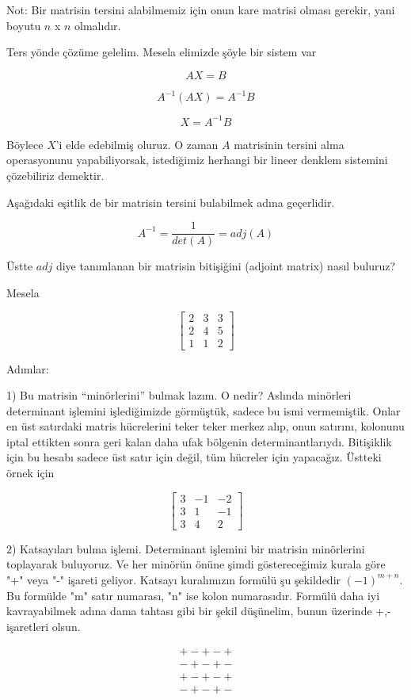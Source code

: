 \documentclass[12pt,fleqn]{article}\usepackage{../../common}
\begin{document}
Not: Bir matrisin tersini alabilmemiz için onun kare matrisi olması gerekir,
yani boyutu $n$ x $n$ olmalıdır.

Ters yönde çözüme gelelim. Mesela elimizde şöyle bir sistem
var

$$  AX = B$$

$$  A^{-1}(AX) = A^{-1}B$$

$$  X = A^{-1}B$$

Böylece $X$'i elde edebilmiş oluruz. O zaman $A$ matrisinin tersini alma
operasyonunu yapabiliyorsak, istediğimiz herhangi bir lineer denklem
sistemini çözebiliriz demektir.

Aşağıdaki eşitlik de bir matrisin tersini bulabilmek adına
geçerlidir.

$$ A^{-1} = \frac{1}{det(A)}  = adj(A)$$

Üstte $adj$ diye tanımlanan bir matrisin bitişiğini (adjoint matrix) nasıl
buluruz?

Mesela

$$
\left[\begin{array}{rrr}
2 & 3 & 3 \\
2 & 4 & 5 \\
1 & 1 & 2
\end{array}\right]
$$

Adımlar:

1) Bu matrisin ``minörlerini'' bulmak lazım. O nedir? Aslında minörleri
determinant işlemini işlediğimizde görmüştük, sadece bu ismi vermemiştik.  Onlar
en üst satırdaki matris hücrelerini teker teker merkez alıp, onun satırını,
kolonunu iptal ettikten sonra geri kalan daha ufak bölgenin
determinantlarıydı. Bitişiklik için bu hesabı sadece üst satır için değil, tüm
hücreler için yapacağız. Üstteki örnek için

$$
\left[\begin{array}{rrr}
3 & -1 & -2 \\
3 & 1 & -1 \\
3 & 4 & 2
\end{array}\right]
$$


2) Katsayıları bulma işlemi. Determinant işlemini bir matrisin minörlerini
toplayarak buluyoruz. Ve her minörün önüne şimdi göstereceğimiz kurala göre "+"
veya "-" işareti geliyor. Katsayı kuralımızın formülü şu şekildedir
$(-1)^{m+n}$. Bu formülde "m" satır numarası, "n" ise kolon numarasıdır. Formülü
daha iyi kavrayabilmek adına dama tahtası gibi bir şekil düşünelim, bunun
üzerinde +,- işaretleri olsun.

$$
\begin{array}{rr}
+ - + - + \\
- + - + - \\
+ - + - + \\
- + - + - \\
\end{array}
$$
\end{document}
